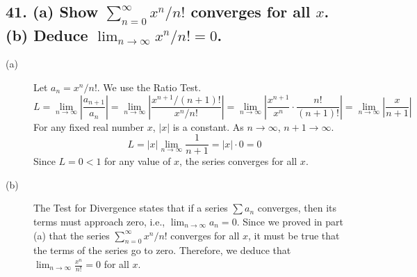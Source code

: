 \documentclass{article}
\begin{document}
\subsection*{41. (a) Show $\sum_{n=0}^\infty x^n/n!$ converges for all $x$. (b) Deduce $\lim_{n \to \infty} x^n/n! = 0$.}
\begin{description}
    \item[(a)] Let $a_n = x^n/n!$. We use the Ratio Test.
    \[ L = \lim_{n \to \infty} \left| \frac{a_{n+1}}{a_n} \right| = \lim_{n \to \infty} \left| \frac{x^{n+1}/(n+1)!}{x^n/n!} \right| = \lim_{n \to \infty} \left| \frac{x^{n+1}}{x^n} \cdot \frac{n!}{(n+1)!} \right| = \lim_{n \to \infty} \left| \frac{x}{n+1} \right| \]
    For any fixed real number $x$, $|x|$ is a constant. As $n \to \infty$, $n+1 \to \infty$.
    \[ L = |x| \lim_{n \to \infty} \frac{1}{n+1} = |x| \cdot 0 = 0 \]
    Since $L=0 < 1$ for any value of $x$, the series converges for all $x$.
    \item[(b)] The Test for Divergence states that if a series $\sum a_n$ converges, then its terms must approach zero, i.e., $\lim_{n \to \infty} a_n = 0$.
    Since we proved in part (a) that the series $\sum_{n=0}^\infty x^n/n!$ converges for all $x$, it must be true that the terms of the series go to zero.
    Therefore, we deduce that $\lim_{n \to \infty} \frac{x^n}{n!} = 0$ for all $x$.
\end{description}
\end{document}
